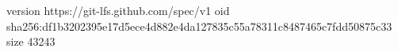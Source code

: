 version https://git-lfs.github.com/spec/v1
oid sha256:df1b3202395e17d5ece4d882e4da127835c55a78311c8487465c7fdd50875c33
size 43243
